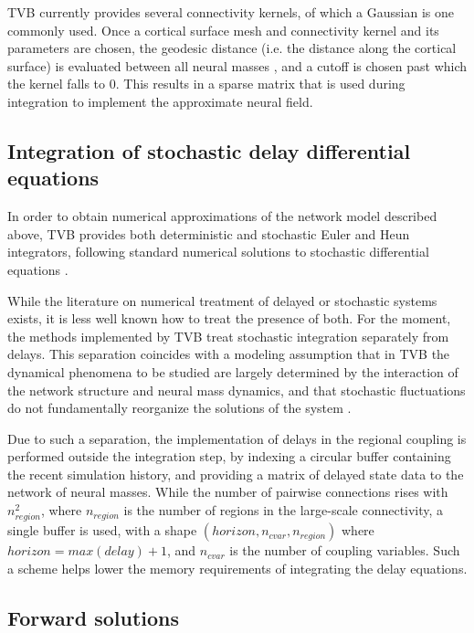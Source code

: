\documentclass{bioinfo}
\begin{document}
	TVB currently provides several connectivity kernels, of which a Gaussian
	is one commonly used. Once a cortical surface mesh 
	and connectivity kernel and its parameters are chosen, the geodesic
	distance (i.e. the distance along the cortical surface) is evaluated
	between all neural masses \citep{Mitchell1987}, and a cutoff is chosen
	past which the kernel falls to 0. This results in a sparse matrix that 
	is used during integration to implement the approximate neural field. 

\subsection{Integration of stochastic delay differential equations}

	In order to obtain numerical approximations of the network model 
	described above, TVB provides both deterministic and stochastic
	Euler and Heun integrators,
	following standard numerical solutions to stochastic
	differential equations \citep{Kloeden_1995,Mannella_2002,Mannella_1989}.

	While the literature on numerical treatment of delayed or 
	stochastic systems exists, it is less well known how to treat 
	the presence of both. For the moment, the methods implemented by TVB
	treat stochastic integration separately from delays. 
	This separation coincides with a modeling assumption that in
	TVB the dynamical phenomena to be studied are largely determined
	by the interaction of the network structure and neural mass dynamics, 
	and that stochastic fluctuations do not fundamentally reorganize the
	solutions of the system \citep{Ghosh_2008,Deco_2009,Deco_2011,Deco_Senden_2012}.

	Due to such a separation, the implementation of delays in the
	regional coupling is performed outside the integration step,
	by indexing a circular buffer containing the recent simulation 
	history, and providing a matrix of delayed state data to the 
	network of neural masses. While the number of pairwise
	connections rises with $n_{region}^2$, where $n_{region}$ is
	the number of regions in the large-scale connectivity, 
	a single buffer is used, with a shape
	$(horizon, n_{cvar}, n_{region})$ where $horizon = max(delay) + 1$,
	and
	$n_{cvar}$ is the number of coupling variables. Such a scheme helps 
	lower the memory requirements of integrating the delay equations.

\subsection{Forward solutions}
\end{document}
